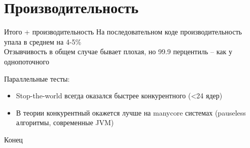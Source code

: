 \documentclass[aspectratio=169
  , xcolor={svgnames} 
  , hyperref={ colorlinks,citecolor=DeepPink4
             , linkcolor=DarkRed,urlcolor=DarkBlue}
  , russian
  ]{beamer}
\theoremstyle{exerciseStyle1}
\begin{document}
\section{Производительность}
\begin{frame}{Итого + производительность}
На последовательном коде производительность упала в среднем на 4-5\% \\

Отзывчивость в общем случае бывает плохая, но 99.9 перцентиль -- как у однопоточного\vspace{.5cm}

Параллельные тесты:\pause
\begin{itemize}
\item Stop-the-world всегда оказался быстрее конкурентного (<24 ядер)
\item В теории конкурентный окажется лучше на manycore системах (pauseless алгоритмы, современные JVM)
\end{itemize}

\end{frame}


\begin{frame}
\begin{center}
  {\Huge Конец}\\
\end{center}
\end{frame}
%
%
\end{document}
